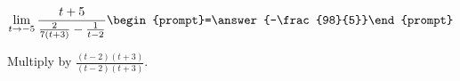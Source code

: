 \documentclass{ximera}
\author{Bart Snapp}
\begin{document}
\begin{exercise}

\[
\lim_{t\to -5 } \frac{t+5}{\frac{2}{7 (t+3)}-\frac{1}{t-2}}  \begin{prompt}=\answer{-\frac{98}{5}}\end{prompt}
\]
\begin{hint}
Multiply by $\frac{(t-2) (t+3)}{(t-2) (t+3)}$.
\end{hint}
\end{exercise}
\end{document}
